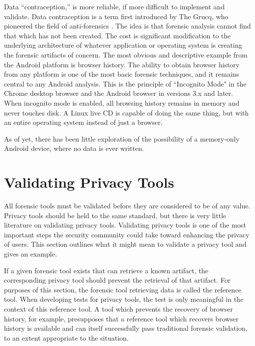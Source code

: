 Data ``contraception,'' is more reliable, if more difficult to implement and validate.  Data contraception is a term first
introduced by The Grucq, who pioneered the field of anti-forensics \cite{defiling}.  The idea is that forensic analysis cannot find
that which has not been created.  The cost is significant modification to the underlying architecture of whatever application or
operating system is creating the forensic artifacts of concern.  The most obvious and descriptive example from the Android platform
is browser history.  The ability to obtain browser history from any platform is one of the most basic forensic techniques, and it
remains central to any Android analysis.  This is the principle of ``Incognito Mode" in the Chrome desktop browser and the Android
browser in versions 3.x and later. When incognito mode is enabled, all browsing history remains in memory and never touches disk. A
Linux live CD is capable of doing the same thing, but with an entire operating system instead of just a browser.

As of yet, there has been little exploration of the possibility of a memory-only Android device, where no data is ever written. 


\section{Validating Privacy Tools}
All forensic tools must be validated before they are considered to be of any value. Privacy tools should be held to the same
standard, but there is very little literature on validating privacy tools.  Validating privacy tools is one of the most important
steps the security community could take toward enhancing the privacy of users.  This section outlines what it might mean to validate
a privacy tool and gives an example. 

If a given forensic tool exists that can retrieve a known artifact, the corresponding privacy tool should prevent the retrieval of
that artifact. For purposes of this section, the forensic tool retrieving data is called the reference tool. When developing tests
for privacy tools, the test is only meaningful in the context of this reference tool. A tool which prevents the recovery of browser
history, for example, presupposes that a reference tool which recovers browser history is available and can itself successfully pass
traditional forensic validation, to an extent appropriate to the situation.

